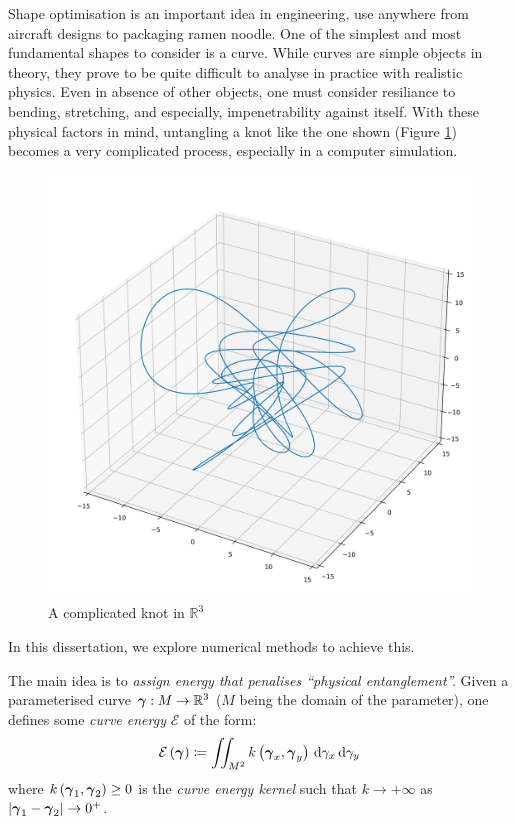 \documentclass[../dissertation.tex]{subfiles}
\begin{document}
Shape optimisation is an important idea in engineering, use anywhere from aircraft designs to packaging ramen noodle.
One of the simplest and most fundamental shapes to consider is a curve.
While curves are simple objects in theory, they prove to be quite difficult to analyse in practice with realistic physics.
Even in absence of other objects, one must consider resiliance to bending, stretching, and especially, impenetrability against itself.
With these physical factors in mind, untangling a knot like the one shown (Figure \ref{fig: Knot}) becomes a very complicated process,
especially in a computer simulation.
\begin{figure}[tpb]
    \centering
    \includegraphics[scale=0.3]{sections/introductionImgs/knot}
    \caption{A complicated knot in $\mathbb{R}^3$}
    \label{fig: Knot}
\end{figure}
In this dissertation, we explore numerical methods to achieve this.

The main idea is to \emph{assign energy that penalises ``physical entanglement''.}
Given a parameterised curve $\boldsymbol{\gamma}:M \rightarrow \mathbb{R}^3$ ($M$ being the domain of the parameter),
one defines some \emph{curve energy} $\mathcal{E}$ of the form:
\begin{equation}
    \mathcal{E} \left( \boldsymbol{\gamma} \right) \coloneqq \iint_{M^2} k\left( \boldsymbol{\gamma}_x, \boldsymbol{\gamma}_y \right) \, \text{d} \gamma_x \, \text{d} \gamma_y
\end{equation}
where $k\left( \boldsymbol{\gamma}_1, \boldsymbol{\gamma}_2 \right) \geq 0$ is the \emph{curve energy kernel} such that $k \rightarrow +\infty$ as $\abs{\gammabf_1 - \gammabf_2} \rightarrow 0^+$.
\end{document}
